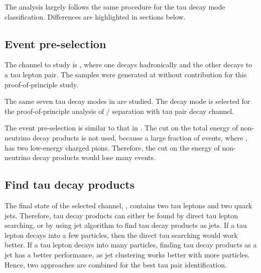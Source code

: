 The analysis largely follows the same procedure for the tau decay mode classification. Differences are highlighted in sections below.



\subsection{Event pre-selection}

The channel to study is \HepProcess{\Pep \Pem \to \PZ \PZ}, where one \PZ decays hadronically and the other \PZ decays to a tau lepton pair. The samples were generated at  without \ISR contribution for this proof-of-principle study.

The same seven tau decay modes in  are studied. The \tauToPion decay mode is selected for the proof-of-principle analysis of \PHiggs / \PZ separation with tau pair decay channel.

The event pre-selection is similar to that in . The cut on the total energy of non-neutrino decay products is not used, because a large fraction of \ZToTauTau events, where \tauToPion, has two low-energy charged pions. Therefore, the cut on the energy of non-neutrino decay products would lose many events.


\subsection{Find tau decay products}
\label{sec:tauHZfindTau}
The final state of the selected channel, \eeZZQQ, contains two tau leptons and two quark jets. Therefore, tau decay products can either be found by direct tau lepton searching, or by using jet algorithm to find tau decay products as jets. If a tau lepton decays into a few particles, then the direct tau searching would work better. If a tau lepton decays into many particles, finding tau decay products as a jet has a better performance, as jet clustering works better with more particles. Hence, two approaches are combined for the best tau pair identification.

